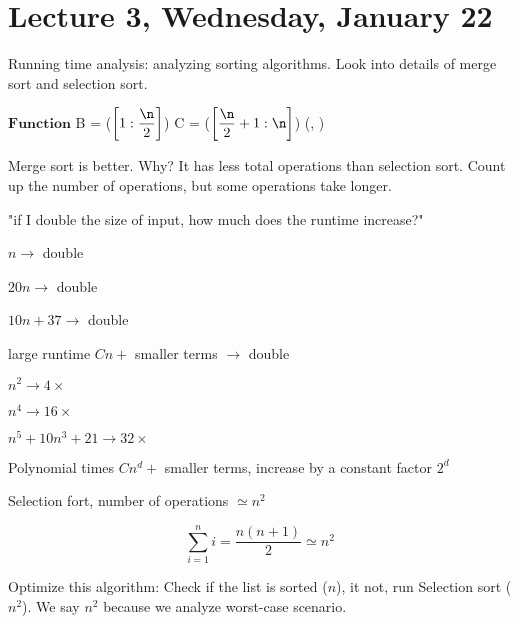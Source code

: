\section{Lecture 3, Wednesday, January 22}


Running time analysis: analyzing sorting algorithms. Look into details of merge
sort and selection sort.


\begin{algorithm}[Algorithm]
\SetAlgoLined
\DontPrintSemicolon
$\mathbf{Function}$ \MergeSort{\Array \A$[1:\n]$}\;
B = \MergeSort(\A$\left[1:\dfrac{\n}{2}\right]$)\;
C = \MergeSort(\B$\left[\dfrac{\n}{2} + 1:\n\right]$)\;
\Return \Merge(\B, \C)\;
\end{algorithm}



Merge sort is better. Why? It has less total operations than selection sort. Count up the number of operations, but some operations take longer.



"if I double the size of input, how much does the runtime increase?"

$n \rightarrow$ double

$20n \rightarrow$ double

$10n + 37 \rightarrow$ double

large runtime $Cn +$ smaller terms $\rightarrow$ double

$n^2 \rightarrow 4\times$

$n^4 \rightarrow 16\times$

$n^5 + 10n^3 + 21 \rightarrow 32\times$

Polynomial times $Cn^d +$ smaller terms, increase by a constant factor $2^d$

Selection fort, number of operations $\simeq n^2$

$$ \sum_{i = 1}^n i = \dfrac{n(n + 1)}{2} \simeq n^2$$

Optimize this algorithm: Check if the list is sorted ($n$), it not, run Selection sort ($n^2$). We say $n^2$ because we analyze worst-case scenario.

